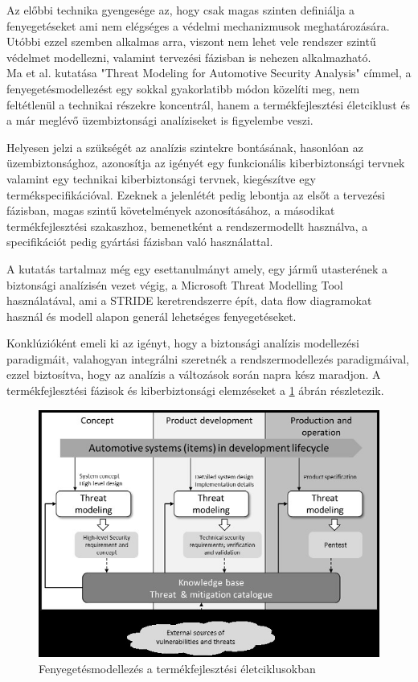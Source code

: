 Az előbbi technika gyengesége az, hogy csak magas szinten definiálja a fenyegetéseket ami nem elégséges a védelmi mechanizmusok meghatározására. Utóbbi ezzel szemben alkalmas arra, viszont nem lehet vele rendszer szintű védelmet modellezni, valamint tervezési fázisban is nehezen alkalmazható.\\

Ma et al.\cite{Ma} kutatása "Threat Modeling for Automotive Security Analysis" címmel, a fenyegetésmodellezést egy sokkal gyakorlatibb módon közelíti meg, nem feltétlenül a technikai részekre koncentrál, hanem a termékfejlesztési életciklust és a már meglévő üzembiztonsági analíziseket is figyelembe veszi. 

Helyesen jelzi a szükségét az analízis szintekre bontásának, hasonlóan az üzembiztonsághoz, azonosítja az igényét egy funkcionális kiberbiztonsági tervnek valamint egy technikai kiberbiztonsági tervnek, kiegészítve egy termékspecifikációval. Ezeknek a jelenlétét pedig lebontja az elsőt a tervezési fázisban, magas szintű követelmények azonosításához, a másodikat termékfejlesztési szakaszhoz, bemenetként a rendszermodellt használva, a specifikációt pedig gyártási fázisban való használattal. 

A kutatás tartalmaz még egy esettanulmányt amely, egy jármű utasterének a biztonsági analízisén vezet végig, a Microsoft Threat Modelling Tool használatával, ami a STRIDE keretrendszerre épít, data flow diagramokat használ és modell alapon generál lehetséges fenyegetéseket. 

Konklúzióként emeli ki az igényt, hogy a biztonsági analízis modellezési paradigmáit, valahogyan integrálni szeretnék a rendszermodellezés paradigmáival, ezzel biztosítva, hogy az analízis a változások során napra kész maradjon. A termékfejlesztési fázisok és kiberbiztonsági elemzéseket a \ref{fig:MA} ábrán részletezik.\\

\begin{figure}[!ht]
\centering
\includegraphics[width=125mm, keepaspectratio]{figures/03_MA.png}
\caption{Fenyegetésmodellezés a termékfejlesztési életciklusokban\cite{Ma}}
\label{fig:MA}
\end{figure}

